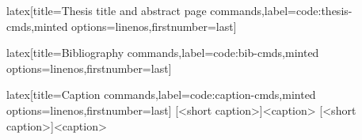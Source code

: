 \begin{code}{latex}[title={Thesis title and abstract page commands},label=code:thesis-cmds,minted options={linenos,firstnumber=last}]
\maketitle[thesis]
\end{code}
%
\begin{code}{latex}[title={Bibliography commands},label=code:bib-cmds,minted options={linenos,firstnumber=last}]
\makebibliography[<options>]
\end{code}
%
\begin{code}{latex}[title={Caption commands},label=code:caption-cmds,minted options={linenos,firstnumber=last}]
[<short caption>]{<caption>}
[<short caption>]{<caption>}
\end{code}
